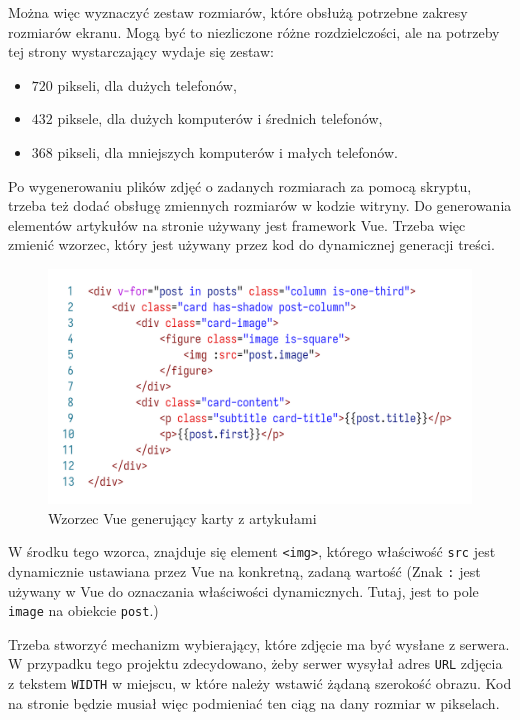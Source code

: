 \documentclass[licencjacka]{pracadypl}
\begin{document}
Można więc wyznaczyć zestaw rozmiarów, które obsłużą potrzebne zakresy rozmiarów ekranu. Mogą być to niezliczone różne rozdzielczości, ale na potrzeby tej strony wystarczający wydaje się zestaw:

\begin{itemize}
  \item $720$ pikseli, dla dużych telefonów,
  \item $432$ piksele, dla dużych komputerów i średnich telefonów,
  \item $368$ pikseli, dla mniejszych komputerów i małych telefonów.
\end{itemize}
 
Po wygenerowaniu plików zdjęć o zadanych rozmiarach za pomocą skryptu, trzeba też dodać obsługę zmiennych rozmiarów w kodzie witryny. Do generowania elementów artykułów na stronie używany jest framework Vue. Trzeba więc zmienić wzorzec, który jest używany przez kod do dynamicznej generacji treści.

\begin{figure}[H]
  \centering
  \includegraphics[width=\linewidth]{images/code-vue-image-card-old.png}
  \caption{Wzorzec Vue generujący karty z artykułami}
  \label{fig:code-vue-template-articles-old}
\end{figure}

W środku tego wzorca, znajduje się element \texttt{<img>}, którego właściwość \texttt{src} jest dynamicznie ustawiana przez Vue na konkretną, zadaną wartość (Znak \texttt{:} jest używany w Vue do oznaczania właściwości dynamicznych. Tutaj, jest to pole \texttt{image} na obiekcie \texttt{post}.)

Trzeba stworzyć mechanizm wybierający, które zdjęcie ma być wysłane z serwera. \linebreak W przypadku tego projektu zdecydowano, żeby serwer wysyłał adres \texttt{URL} zdjęcia z tekstem \texttt{WIDTH} w miejscu, w które należy wstawić żądaną szerokość obrazu. Kod na stronie będzie musiał więc podmieniać ten ciąg na dany rozmiar w pikselach.
\end{document}
